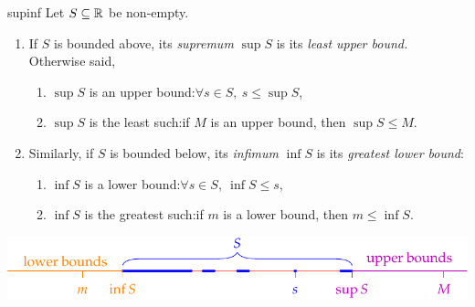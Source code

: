 \begin{defn}{}{supinf}
	Let $S\subseteq\mathbb{R}$ be non-empty.
	\begin{enumerate}
	  \item If $S$ is bounded above, its \emph{supremum} $\sup S$ is its \emph{least upper bound.} Otherwise said,
		\begin{enumerate}
	  	\item $\sup S$ is an upper bound:\lstsp $\forall s\in S,\ s\le \sup S$,
	  	\item $\sup S$ is the least such:\lstsp if $M$ is an upper bound, then $\sup S\le M$.
		\end{enumerate}
		\item Similarly, if $S$ is bounded below, its \emph{infimum} $\inf S$ is its \emph{greatest lower bound}:
		\begin{enumerate}
	  	\item $\inf S$ is a lower bound:\lstsp $\forall s\in S,\ \inf S\le s$,
	  	\item $\inf S$ is the greatest such:\lstsp if $m$ is a lower bound, then $m\le\inf S$.
		\end{enumerate}
	\end{enumerate}
	\begin{center}
		\vspace{-10pt}
		\includegraphics{supinf}
	\end{center}
\end{defn}

\goodbreak




